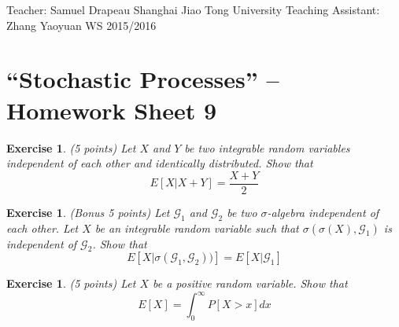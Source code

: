 \documentclass[DIV=classic,a4paper,10pt]{scrartcl}
\newtheorem{exercise}[theorem]{Exercise}
\theoremstyle{nonumberplain}
\numberwithin{equation}{section}
\begin{document}
\noindent
Teacher: Samuel Drapeau \hfill Shanghai Jiao Tong University \newline
Teaching Assistant: Zhang Yaoyuan \hfill WS 2015/2016

\smallskip
\noindent
\hrulefill

\smallskip

\setcounter{section}{9}

\pagestyle{empty}


\section*{``Stochastic Processes'' -- Homework Sheet 9}
\thispagestyle{empty}




\begin{exercise}(5 points)
    Let $X$ and $Y$ be two integrable random variables independent of each other and identically distributed.
    Show that
    \begin{equation*}
        E\left[ X |X+Y \right]=\frac{X+Y}{2}
    \end{equation*}
\end{exercise}

\begin{exercise}(Bonus 5 points)
    Let $\mathcal{G}_1$ and $\mathcal{G}_2$ be two $\sigma$-algebra independent of each other.
    Let $X$ be an integrable random variable such that $\sigma(\sigma(X),\mathcal{G}_1)$ is independent of $\mathcal{G}_2$.
    Show that
    \begin{equation*}
        E\left[ X |\sigma(\mathcal{G}_1,\mathcal{G}_2)) \right]=E\left[ X|\mathcal{G}_1 \right]
    \end{equation*}
\end{exercise}


\begin{exercise}(5 points)
    Let $X$ be a positive random variable.
    Show that
    \begin{equation*}
        E\left[ X \right]=\int_{0}^{\infty}P\left[ X > x \right] dx
    \end{equation*}
\end{exercise}
\end{document}
